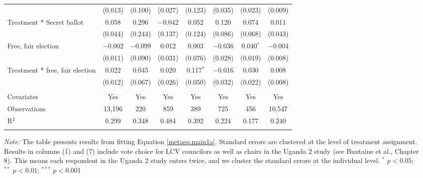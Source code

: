\begin{table}[H]
{\begin{tabular}{@{\extracolsep{1pt}}lccccccc}
  & (0.013) & (0.100) & (0.027) & (0.123) & (0.035) & (0.023) & (0.009) \\ 
  Treatment * Secret ballot & 0.058 & 0.296 & $-$0.042 & 0.052 & 0.120 & 0.074 & 0.011 \\ 
  & (0.044) & (0.244) & (0.137) & (0.124) & (0.086) & (0.068) & (0.043) \\ 
  Free, fair election & $-$0.002 & $-$0.099 & 0.012 & 0.003 & $-$0.036 & 0.040$^{*}$ & $-$0.004 \\ 
  & (0.011) & (0.090) & (0.031) & (0.076) & (0.028) & (0.019) & (0.008) \\ 
  Treatment * free, fair election & 0.022 & 0.045 & 0.020 & 0.117$^{*}$ & $-$0.016 & 0.030 & 0.008 \\ 
  & (0.012) & (0.067) & (0.026) & (0.050) & (0.032) & (0.022) & (0.008) \\ 
 \hline \\[-1.8ex] 
Covariates & Yes & Yes & Yes & Yes & Yes & Yes & Yes \\ 
Observations & 13,196 & 220 & 859 & 389 & 725 & 456 & 10,547 \\ 
R$^{2}$ & 0.299 & 0.348 & 0.484 & 0.392 & 0.224 & 0.177 & 0.240 \\ 
\hline 
\hline \\[-1.8ex] 
\end{tabular}}
\begin{flushleft} \hspace{1cm} \scriptsize{{\textit{Note:}  The table presents results from fitting Equation \ref{metaeq.main1a}. Standard errors are clustered at the level of treatment assignment. Results in columns (1) and (7) include vote choice for LCV councilors as well as chairs in the Uganda 2 study (see Buntaine et al., Chapter 8). This means each respondent in the Uganda 2 study enters twice, and we cluster the standard errors at the individual level. $^{*}$ $p<0.05$; $^{**}$ $p<0.01$; $^{***}$ $p<0.001$ }} \end{flushleft} \end{table}
